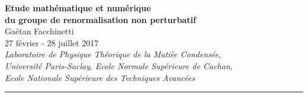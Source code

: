 \documentclass[10pt]{article}
\begin{document}
\vspace*{-22pt}
\begin{center}
\textbf{\Large Etude mathématique et numérique \\ du groupe de renormalisation non perturbatif}\\
\vspace*{4pt}
Gaétan Facchinetti \\
{\small 27 février - 28 juillet 2017\\
\vspace*{5pt}
\textit{Laboratoire de Physique Théorique de la Matièe Condensée},\\
\textit{Université Paris-Saclay}, \textit{Ecole Normale Supérieure de Cachan}, \\
\textit{Ecole Nationale Supérieure des Techniques Avancées}}\\
\end{center}


\begin{center}
\rule{10cm}{1pt}
\end{center}

\end{document}

